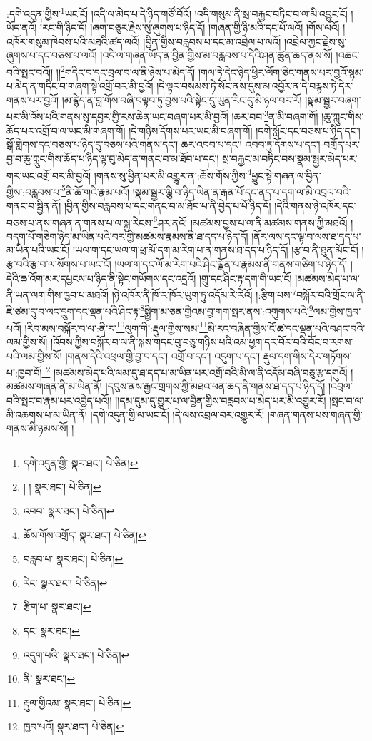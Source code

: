 :དགེ་འདུན་གྱིས་\footnote{དགེ་འདུན་གྱི་  སྣར་ཐང་།  པེ་ཅིན། }ཡང་ངོ། །འདི་ལ་མེད་པ་དེ་ཉིད་གཙོ་བོའོ། །འདི་གསུམ་ནི་སྲ་བརྐྱང་བཏིང་བ་ལ་མི་འབྱུང་ངོ། །ཡོད་ནའོ། །རང་གི་ཉིད་དོ། །ཞག་བཅུར་རྗེས་སུ་ཞུགས་པ་ཉིད་དོ། །གཞན་གྱི་ཉི་མའི་དང་པོ་ལའོ། །གོས་ལའོ། །འཁོར་གསུམ་ཁེབས་པའི་མཐའི་ཚད་ལའོ། །བྱིན་གྱིས་བརླབས་པ་དང་མ་འབྲེལ་པ་ལའོ། །འབྲེལ་ཀྱང་རྗེས་སུ་ཞུགས་པ་དང་བཅས་པ་ལའོ། །འདི་ལ་གཞན་ཡོད་ན་བྱིན་གྱིས་མ་བརླབས་པ་དེའི་ཤན་ཚུན་ཆད་ནས་སོ། །འཆང་བའི་སྤང་བའོ།། །།\footnote{། །  སྣར་ཐང་།  པེ་ཅིན། }གདིང་བ་དང་བྲལ་བ་ལ་ནི་ཉེས་པ་མེད་དོ། །གལ་ཏེ་དེང་ཉིད་ཕྱིར་ལོག་ཅིང་གནས་པར་བྱའོ་སྙམ་པ་མེད་ན་གདིང་བ་གཞག་སྟེ་འགྲོ་བར་མི་བྱའོ། །དེ་ལྟར་བསམས་ཏེ་སོང་ནས་དུས་མ་འབྱོར་ན་དེ་བརྙས་ཏེ་དེར་གནས་པར་བྱའོ། །མ་རྙེད་ན་བླ་གོས་བཞི་བལྟབ་ཏུ་བྱས་པའི་སྟེང་དུ་ཡུན་རིང་དུ་མི་ཉལ་བར་རོ། །སྣམ་སྦྱར་བཞག་པར་མི་འོས་པའི་གནས་སུ་དབྱར་གྱི་རས་ཆེན་ཡང་བཞག་པར་མི་བྱའོ། །ཆར་བབ་\footnote{འབབ་  སྣར་ཐང་།  པེ་ཅིན། }ན་མི་བཞག་གོ། །ཆུ་ཀླུང་གིས་ཆོད་པར་འགྲོ་བ་ལ་ཡང་མི་གཞག་གོ། །དེ་གཉིས་དོགས་པར་ཡང་མི་བཞག་གོ། །དགེ་སློང་དང་བཅས་པ་ཉིད་དང་། སྒོ་གླེགས་དང་བཅས་པ་ཉིད་དུ་བཅས་པའི་གནས་དང་། ཆར་འབབ་པ་དང་། འབབ་ཏུ་དོགས་པ་དང་། བགྲོད་པར་བྱ་བ་ཆུ་ཀླུང་གིས་ཆོད་པ་ཉིད་ལྟ་བུ་མེད་ན་གནང་བ་མ་ཐོབ་པ་དང་། སྲ་བརྐྱང་མ་བཏིང་བས་སྣམ་སྦྱར་མེད་པར་གར་ཡང་འགྲོ་བར་མི་བྱའོ། །གནས་སུ་ཕྱིན་པར་མི་འགྱུར་ན་:ཆོས་གོས་ཀྱིས་\footnote{ཆོས་གོས་འགྲོད་  སྣར་ཐང་།  པེ་ཅིན། }ཕྱུང་སྟེ་གཞན་ལ་བྱིན་གྱིས་:བརླབས་པ་\footnote{བརླབ་པ་  སྣར་ཐང་།  པེ་ཅིན། }ནི་ཆོ་གའི་རྣམ་པའོ། །སྣམ་སྦྱར་ལྕི་བ་ཉིད་ཡིན་ན་རྒན་པོ་དང་ནད་པ་དག་ལ་མི་འབྲལ་བའི་གནང་བ་སྦྱིན་ནོ། །བྱིན་གྱིས་བརླབས་པ་དང་གནང་བ་མ་ཐོབ་པ་ནི་བྱེད་པ་པོ་ཉིད་དོ། །དེའི་གནས་ཉེ་འཁོར་དང་བཅས་པ་ནས་གཞན་ན་གནས་པ་ལ་སྐྱ་རེངས་\footnote{རེང་  སྣར་ཐང་།  པེ་ཅིན། }ཤར་ནའོ། །མཚམས་བྱས་པ་ལ་ནི་མཚམས་གནས་ཀྱི་མཐའོ། །བདག་པོ་གཅིག་ཉིད་མ་ཡིན་པའི་བར་གྱི་མཚམས་རྣམས་ནི་ཐ་དད་པ་ཉིད་དོ། །ནོར་ལས་དང་ལྟ་བ་ལས་ཐ་དད་པ་མ་ཡིན་པའི་ཡང་ངོ། །ཡལ་ག་དང་ཡལ་ག་ཕྲ་མོ་དག་མ་རེག་པ་ན་གནས་ཐ་དད་པ་ཉིད་དོ། །རྩ་བ་ནི་ཐུན་མོང་ངོ། །རྩ་བའི་རྩ་བ་ལ་སོགས་པ་ཡང་ངོ། །ཡལ་ག་དང་ལོ་མ་རེག་པའི་ཤིང་ལྗོན་པ་རྣམས་ནི་གནས་གཅིག་པ་ཉིད་དོ། །དེའི་ཆ་འོག་མར་དཔྱངས་པ་ཉིད་ནི་སྟེང་གཡོགས་དང་འདྲའོ། །གྲུ་དང་ཤིང་རྟ་དག་གི་ཡང་ངོ། །མཚམས་མེད་པ་ལ་ནི་ཡན་ལག་གིས་ཁྱབ་པ་མཐའོ། །ཉེ་འཁོར་ནི་ཁོ་ར་ཁོར་ཡུག་ཏུ་འདོམ་རེ་རེའོ། །:རྩིག་པས་\footnote{རྩིག་པ་  སྣར་ཐང་། }བསྐོར་བའི་གྲོང་ལ་ནི་ཇི་ཙམ་དུ་བ་ལང་དྲུག་དང་ལྡན་པའི་ཤིང་རྟ་\footnote{དང་  སྣར་ཐང་། }སྨྱིག་མ་ཅན་གྱིའམ་བྱ་གག་སྤར་ནས་:འགུགས་པའི་\footnote{འདུག་པའི་  སྣར་ཐང་།  པེ་ཅིན། }ལམ་གྱིས་ཁྱབ་པའོ། །རིབ་མས་བསྐོར་བ་ལ་:ནི་ར་\footnote{ནི་  སྣར་ཐང་། }ལུག་གི་:རྡུལ་གྱིས་སམ་\footnote{རྡུལ་གྱིའམ་  སྣར་ཐང་།  པེ་ཅིན། }མི་རང་བཞིན་གྱིས་ངོ་ཚ་དང་ལྡན་པའི་བཤང་བའི་ལམ་གྱིས་སོ། །འོབས་ཀྱིས་བསྐོར་བ་ལ་ནི་སྐས་གདང་བུ་བཅུ་གཉིས་པའི་འམ་ཕྱག་དར་བོར་བའི་བོང་བ་རགས་པའི་ལམ་གྱིས་སོ། །གནས་དེའི་འཕྲལ་གྱི་བྱ་བ་དང་། འགྲོ་བ་དང་། འདུག་པ་དང་། རྡུལ་དག་གིས་དེར་གཏོགས་པ་:ཁྱབ་བོ།\footnote{ཁྱབ་པའོ།  སྣར་ཐང་།  པེ་ཅིན། } །མཚམས་མེད་པའི་ལམ་དུ་ཐ་དད་པ་མ་ཡིན་པར་འགྲོ་བའི་མི་ལ་ནི་འདོམ་བཞི་བཅུ་རྩ་དགུའོ། །མཚམས་གཞན་ནི་མ་ཡིན་ནོ། །དབུས་ནས་རྒྱང་གྲགས་ཀྱི་མཐའ་ཕན་ཆད་ནི་གནས་ཐ་དད་པ་ཉིད་དོ། །འབྲལ་བའི་སྤང་བ་རྣམ་པར་འབྱེད་པའོ།། །།དམ་དུམ་དུ་གྱུར་པ་ལ་བྱིན་གྱིས་བརླབས་པ་མེད་པར་མི་འགྱུར་རོ། །སྤང་བ་ལ་མི་འཆགས་པ་མ་ཡིན་ནོ། །དགེ་འདུན་གྱི་ལ་ཡང་ངོ། །དེ་ལས་འབྲལ་བར་འགྱུར་རོ། །གཞན་གནས་པས་གཞན་གྱི་གནས་མི་ཉམས་སོ། །
